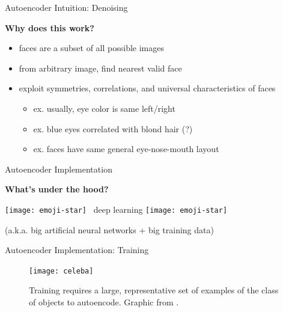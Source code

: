 \begin{frame}{Autoencoder Intuition: Denoising}

\Large

\textbf{Why does this work?}

\pause

\begin{itemize}[<+->]
\item faces are a subset of all possible images
\item from arbitrary image, find nearest valid face
\item exploit symmetries, correlations, and universal characteristics of faces
\begin{itemize}[<+->]
\item ex. usually, eye color is same left/right
\item ex. blue eyes correlated with blond hair (?)
\item ex. faces have same general eye-nose-mouth layout
\end{itemize}

\end{itemize}

\end{frame}

\begin{frame}{Autoencoder Implementation}

\Large

\textbf{What's under the hood?}

\pause

\vspace{3ex}
\centering

\HUGE
\texttt{[image: emoji-star]}
~deep learning
\texttt{[image: emoji-star]}

\normalsize

(a.k.a. big artificial neural networks + big training data)

\end{frame}

\begin{frame}{Autoencoder Implementation: Training}
\begin{figure}
\texttt{[image: celeba]}
\caption{
Training requires a large, representative set of examples of the class of objects to autoencode.
Graphic from \cite{liu2015faceattributes}.
}
\end{figure}
\end{frame}
